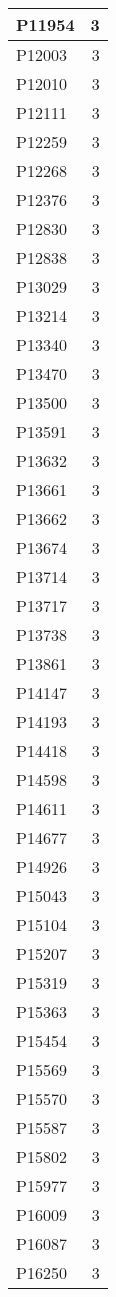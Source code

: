 \documentclass[
]{book}
\theoremstyle{definition}
\theoremstyle{definition}
\theoremstyle{definition}
\theoremstyle{definition}
\theoremstyle{remark}
\begin{document}
\begin{table}
\begin{tabular}{l|r}
\hline
P11954 & 3\\
\hline
P12003 & 3\\
\hline
P12010 & 3\\
\hline
P12111 & 3\\
\hline
P12259 & 3\\
\hline
P12268 & 3\\
\hline
P12376 & 3\\
\hline
P12830 & 3\\
\hline
P12838 & 3\\
\hline
P13029 & 3\\
\hline
P13214 & 3\\
\hline
P13340 & 3\\
\hline
P13470 & 3\\
\hline
P13500 & 3\\
\hline
P13591 & 3\\
\hline
P13632 & 3\\
\hline
P13661 & 3\\
\hline
P13662 & 3\\
\hline
P13674 & 3\\
\hline
P13714 & 3\\
\hline
P13717 & 3\\
\hline
P13738 & 3\\
\hline
P13861 & 3\\
\hline
P14147 & 3\\
\hline
P14193 & 3\\
\hline
P14418 & 3\\
\hline
P14598 & 3\\
\hline
P14611 & 3\\
\hline
P14677 & 3\\
\hline
P14926 & 3\\
\hline
P15043 & 3\\
\hline
P15104 & 3\\
\hline
P15207 & 3\\
\hline
P15319 & 3\\
\hline
P15363 & 3\\
\hline
P15454 & 3\\
\hline
P15569 & 3\\
\hline
P15570 & 3\\
\hline
P15587 & 3\\
\hline
P15802 & 3\\
\hline
P15977 & 3\\
\hline
P16009 & 3\\
\hline
P16087 & 3\\
\hline
P16250 & 3\\

\end{tabular}
\end{table}
\end{document}
